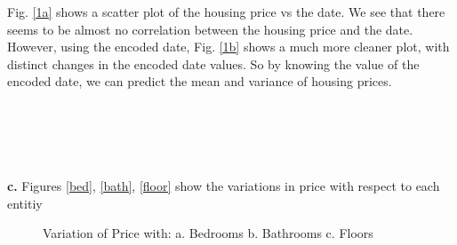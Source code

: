 \documentclass{article}
\begin{document}
Fig. \ref{1a} shows a scatter plot of the housing price vs the date. We see that there seems to be almost no correlation between the housing price and the date. However, using the encoded date, Fig. \ref{1b} shows a much more cleaner plot, with distinct changes in the encoded date values. So by knowing the value of the encoded date, we can predict the mean and variance of housing prices.\\ \\ \\ \\ \\ \\


\textbf{c.} Figures \ref{bed}, \ref{bath}, \ref{floor} show the variations in price with respect to each entitiy


\begin{figure}[h]
    \centering
    \qquad
    \qquad
    \caption{Variation of Price with: a. Bedrooms b. Bathrooms c. Floors}%
    \label{fig:price}%
\end{figure}
\end{document}
